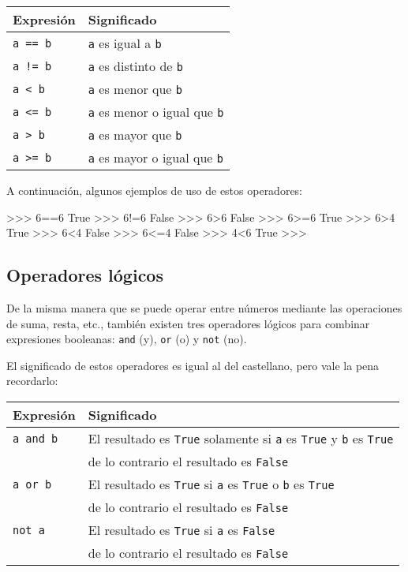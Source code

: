 \begin{tabular}[c]{|l|l|}
\hline {\bf Expresión} & {\bf Significado}\\
\hline \hline
\lstinline!a == b!& \lstinline!a! es igual a \lstinline!b! \\\hline
\lstinline+a != b+& \lstinline!a! es distinto de \lstinline!b! \\\hline
\lstinline!a < b!& \lstinline!a! es menor que \lstinline!b! \\\hline
\lstinline!a <= b!& \lstinline!a! es menor o igual que \lstinline!b! \\\hline
\lstinline!a > b!& \lstinline!a! es mayor que \lstinline!b! \\\hline
\lstinline!a >= b!& \lstinline!a! es mayor o igual que \lstinline!b! \\\hline
\end{tabular}

A continuación, algunos ejemplos de uso de estos operadores:

\begin{codigo-python-sn}
>>> 6==6
True
>>> 6!=6
False
>>> 6>6
False
>>> 6>=6
True
>>> 6>4
True
>>> 6<4
False
>>> 6<=4
False
>>> 4<6
True
>>>
\end{codigo-python-sn}

\subsection{Operadores lógicos}

De la misma manera que se puede operar entre números mediante las
operaciones de suma, resta, etc., también existen tres operadores lógicos
para combinar expresiones booleanas: \lstinline!and! (y), \lstinline!or!
(o) y \lstinline!not! (no).

El significado de estos operadores es igual al del castellano, pero vale la pena recordarlo:

\begin{tabular}[c]{|l|l|}
\hline {\bf Expresión} & {\bf Significado}\\
\hline \hline
\lstinline!a and b!& El resultado es \lstinline!True! solamente si
\lstinline!a! es \lstinline!True! y  \lstinline!b! es \lstinline!True! \\
& de lo contrario el resultado es \lstinline!False!\\\hline
\lstinline!a or b!& El resultado es \lstinline!True! si \lstinline!a! es
\lstinline!True! o  \lstinline!b! es \lstinline!True! \\
& de lo contrario el resultado es \lstinline!False!\\\hline
\lstinline!not a!& El resultado es \lstinline!True! si \lstinline!a! es
\lstinline!False!\\
& de lo contrario el resultado es \lstinline!False!\\\hline
\end{tabular}

